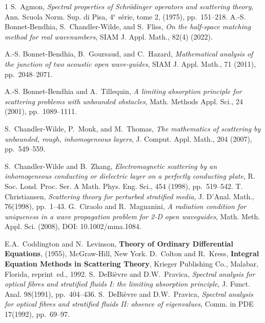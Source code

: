 \documentclass[11pt]{article}
\theoremstyle{definition}
\theoremstyle{remark}
\begin{document}
   
\begin{thebibliography}{1}
 {\sc S.~Agmon}, {\em Spectral properties of Schr\"odinger
  operators and scattering theory}, Ann. Scuola Norm. Sup. di Pisa, 4${}^e$ s\'erie,
  tome 2, (1975), pp.~151--218.
{\sc A.-S. Bonnet-Bendhia, S.~Chandler-Wilde, and S.~Fliss}, {\em On the
  half-space matching method for real wavenumbers}, SIAM J. Appl. Math.,
  82(4) (2022).

{\sc A.-S. Bonnet-Bendhia, B.~Goursaud, and C.~Hazard}, {\em Mathematical
  analysis of the junction of two acoustic open wave-guides}, SIAM J. Appl.
  Math., 71 (2011), pp.~2048--2071.

{\sc A.-S. Bonnet-Bendhia and A.~Tillequin}, {\em A limiting absorption
  principle for scattering problems with unbounded obstacles}, Math. Methods
  Appl. Sci., 24 (2001), pp.~1089–1111.

{\sc S.~Chandler-Wilde, P.~Monk, and M.~Thomas}, {\em The mathematics of
  scattering by unbounded, rough, inhomogeneous layers}, J. Comput. Appl.
  Math., 204 (2007), pp.~549–559.

{\sc S.~Chandler-Wilde and B.~Zhang}, {\em Electromagnetic scattering by an
  inhomogeneous conducting or dielectric layer on a perfectly conducting
  plate}, R. Soc. Lond. Proc. Ser. A Math. Phys. Eng. Sci., 454 (1998),
pp.~519–542.
 {\sc T. Christiansen}, {\em Scattering theory for
  perturbed stratified media}, J. D'Anal. Math., 76(1998), pp.~1--43.
 {\sc
  G.~Ciraolo and R.~Magnanini}, {\em A radiation condition for uniqueness in a
  wave propagation problem for 2-D open waveguides},
  Math. Meth. Appl. Sci. (2008), DOI: 10.1002/mma.1084.

 {\sc E.A.~Coddington and N.~Levinson}, {\bf Theory
  of Ordinary Differential Equations}, (1955), McGraw-Hill, New York.
{\sc D.~Colton and R.~Kress}, {\bf Integral Equation Methods in Scattering
  Theory}, Krieger Publishing Co., Malabar, Florida, reprint~ed., 1992.
 {\sc S.~DeBi\`evre and D.W.~Pravica}, {\em Spectral
  analysis for optical fibres and stratified fluids I: the limiting absorption
  principle}, J. Funct. Anal. 98(1991), pp.~404--436.
            {\sc S.~DeBi\`evre and D.W.~Pravica},
             {\em Spectral
  analysis for optical fibres and stratified fluids II: absence of eigenvalues},
             Comm. in PDE  17(1992), pp.~69--97.


\end{thebibliography}
\end{document}
